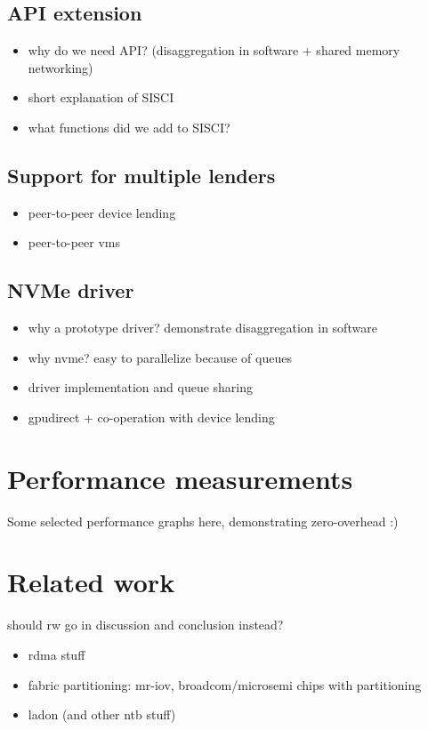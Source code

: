 \subsection{API extension}
\begin{itemize}
    \item why do we need API? (disaggregation in software + shared memory networking)
    \item short explanation of SISCI
    \item what functions did we add to SISCI?
\end{itemize}

\subsection{Support for multiple lenders}
\begin{itemize}
    \item peer-to-peer device lending
    \item peer-to-peer vms
\end{itemize}


\subsection{NVMe driver}\label{sec:nvme}
\begin{itemize}
    \item why a prototype driver? demonstrate disaggregation in software
    \item why nvme? easy to parallelize because of queues
    \item driver implementation and queue sharing
    \item gpudirect + co-operation with device lending
\end{itemize}


\section{Performance measurements}\label{sec:eval}
Some selected performance graphs here, demonstrating zero-overhead :)

\section{Related work}\label{sec:rw}
should rw go in discussion and conclusion instead?
\begin{itemize}
    \item rdma stuff
    \item fabric partitioning: mr-iov, broadcom/microsemi chips with partitioning
    \item ladon (and other ntb stuff)
\end{itemize}

%
